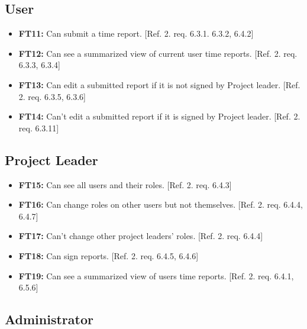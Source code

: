 \documentclass{article}
\begin{document}
		\subsection{User}
		
		\begin{itemize}
  			\item \textbf{FT11:} Can submit a time report. [Ref. 2. req. 6.3.1. 6.3.2, 6.4.2]
  			
  			\item \textbf{FT12:} Can see a summarized view of current user time reports. [Ref. 2. req. 6.3.3, 6.3.4]
  			
  			\item \textbf{FT13:} Can edit a submitted report if it is not signed by Project leader. [Ref. 2. req. 6.3.5, 6.3.6]
  			
  			 \item \textbf{FT14:} Can't edit a submitted report if it is signed by Project leader. [Ref. 2. req. 6.3.11]


		\end{itemize}
		
		\subsection{Project Leader}
		
			\begin{itemize}
  			\item \textbf{FT15:} Can see all users and their roles. [Ref. 2. req. 6.4.3]

  			\item \textbf{FT16:} Can change roles on other users but not themselves. [Ref. 2. req. 6.4.4, 6.4.7]
  			
  			\item \textbf{FT17:} Can’t change other project leaders' roles. [Ref. 2. req. 6.4.4]
  			
  			\item \textbf{FT18:} Can sign reports. [Ref. 2. req. 6.4.5, 6.4.6]

  			\item \textbf{FT19:} Can see a summarized view of users time reports. [Ref. 2. req. 6.4.1, 6.5.6]

		\end{itemize}
		
		\subsection{Administrator}
		
\end{document}
